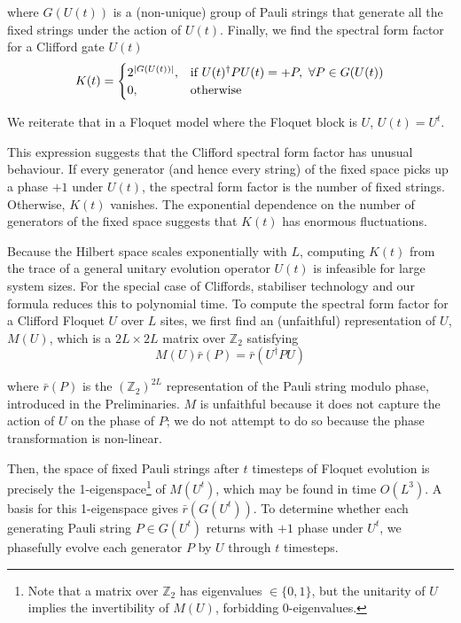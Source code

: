 \documentclass[10pt]{article}
\begin{document}
where $G(U(t))$ is a (non-unique) group of Pauli strings that generate all the fixed strings under the action of $U(t)$. Finally, we find the spectral form factor for a Clifford gate $U(t)$
\begin{equation}
K(t) = 
\begin{cases}
2^{\abs{G(U(t))}}, & \text{if } U(t)^\dagger P U(t) = +P, \ \forall P \in G(U(t)) \\
0, 				   & \text{otherwise}
\end{cases}
\label{eq_sffclif}
\end{equation} 

We reiterate that in a Floquet model where the Floquet block is $U$, $U(t)= U^t$. 

This expression suggests that the Clifford spectral form factor has unusual behaviour. If every generator (and hence every string) of the fixed space picks up a phase $+1$ under $U(t)$, the spectral form factor is the number of fixed strings. Otherwise, $K(t)$ vanishes. The exponential dependence on the number of generators of the fixed space suggests that $K(t)$ has enormous fluctuations.

Because the Hilbert space scales exponentially with $L$, computing $K(t)$ from the trace of a general unitary evolution operator $U(t)$ is infeasible for large system sizes. For the special case of Cliffords, stabiliser technology and our formula reduces this to polynomial time. To compute the spectral form factor for a Clifford Floquet $U$ over $L$ sites, we first find an (unfaithful) representation of $U$, $M(U)$, which is a $2L \times 2L$ matrix over $\mathbb{Z}_2$ satisfying
\begin{equation}
M(U) \bar{r}(P) = \bar{r}(U^\dagger P U)
\end{equation}

where $\bar{r}(P)$ is the $(\mathbb{Z}_2)^{2L}$ representation of the Pauli string modulo phase, introduced in the Preliminaries. $M$ is unfaithful because it does not capture the action of $U$ on the phase of $P$; we do not attempt to do so because the phase transformation is non-linear. 

Then, the space of fixed Pauli strings after $t$ timesteps of Floquet evolution is precisely the 1-eigenspace\footnote{Note that a matrix over $\mathbb{Z}_2$ has eigenvalues $\in\{0,1\}$, but the unitarity of $U$ implies the invertibility of $M(U)$, forbidding 0-eigenvalues.} of $M\left(U^t\right)$, which may be found in time $O(L^3)$. A basis for this 1-eigenspace gives $\bar{r}\left(G\left(U^t\right)\right)$. To determine whether each generating Pauli string $P \in G\left(U^t\right)$ returns with $+1$ phase under $U^t$, we phasefully evolve each generator $P$ by $U$ through $t$ timesteps.
\end{document}
